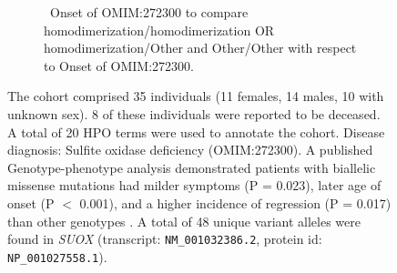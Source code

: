 \begin{figure}[htbp]
\vspace{0.2em}

\begin{subfigure}[b]{0.95\textwidth}
\captionsetup{justification=raggedright,singlelinecheck=false}
\caption{ Onset of OMIM:272300 to compare homodimerization/homodimerization OR homodimerization/Other and Other/Other with respect to Onset of OMIM:272300. }
\end{subfigure}

\vspace{0.2em}

\caption{ The cohort comprised 35 individuals (11 females, 14 males, 10 with unknown sex). 8 of these individuals were reported to be deceased. 
A total of 20 HPO terms were used to annotate the cohort. Disease diagnosis: Sulfite oxidase deficiency (OMIM:272300). 
A published Genotype-phenotype analysis demonstrated patients with biallelic missense mutations 
had milder symptoms (P = 0.023), later age of onset (P $<$ 0.001), and a higher incidence of regression (P = 0.017)
than other genotypes \cite{PMID_36303223}. A total of 48 unique variant alleles were found in \textit{SUOX} (transcript: \texttt{NM\_001032386.2}, protein id: \texttt{NP\_001027558.1}).}
\end{figure}
